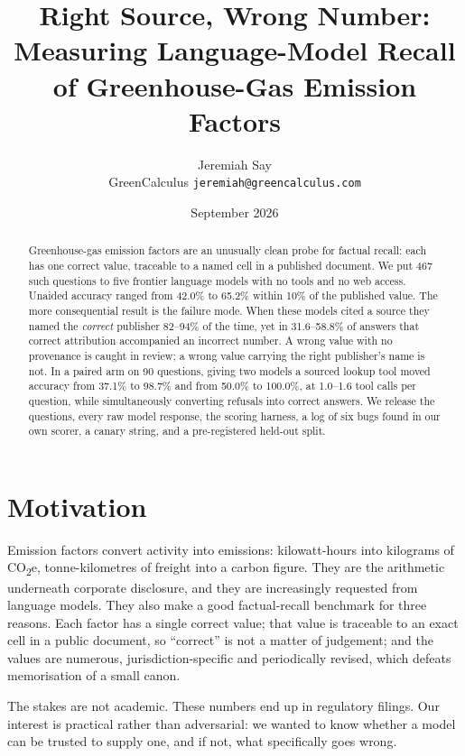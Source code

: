 \documentclass[10pt,a4paper]{article}
\title{\vspace{-2.2em}\textbf{Right Source, Wrong Number:\\Measuring Language-Model Recall of Greenhouse-Gas Emission Factors}\vspace{-0.6em}}
\author{Jeremiah Say\\\small GreenCalculus \quad \texttt{jeremiah@greencalculus.com}}
\date{\vspace{-1em}\small September 2026}
\begin{document}
\maketitle
\vspace{-1.5em}

\begin{abstract}
\small
Greenhouse-gas emission factors are an unusually clean probe for factual recall: each has one correct value, traceable to a named cell in a published document. We put 467 such questions to five frontier language models with no tools and no web access. Unaided accuracy ranged from 42.0\% to 65.2\% within 10\% of the published value. The more consequential result is the failure mode. When these models cited a source they named the \emph{correct} publisher 82--94\% of the time, yet in 31.6--58.8\% of answers that correct attribution accompanied an incorrect number. A wrong value with no provenance is caught in review; a wrong value carrying the right publisher's name is not. In a paired arm on 90 questions, giving two models a sourced lookup tool moved accuracy from 37.1\% to 98.7\% and from 50.0\% to 100.0\%, at 1.0--1.6 tool calls per question, while simultaneously converting refusals into correct answers. We release the questions, every raw model response, the scoring harness, a log of six bugs found in our own scorer, a canary string, and a pre-registered held-out split.
\end{abstract}

\vspace{-0.6em}
\section{Motivation}

Emission factors convert activity into emissions: kilowatt-hours into kilograms of CO\textsubscript{2}e, tonne-kilometres of freight into a carbon figure. They are the arithmetic underneath corporate disclosure, and they are increasingly requested from language models. They also make a good factual-recall benchmark for three reasons. Each factor has a single correct value; that value is traceable to an exact cell in a public document, so ``correct'' is not a matter of judgement; and the values are numerous, jurisdiction-specific and periodically revised, which defeats memorisation of a small canon.

The stakes are not academic. These numbers end up in regulatory filings. Our interest is practical rather than adversarial: we wanted to know whether a model can be trusted to supply one, and if not, what specifically goes wrong.
\end{document}
